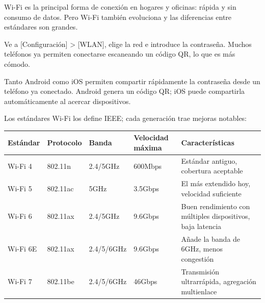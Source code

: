 Wi-Fi es la principal forma de conexión en hogares y oficinas: rápida y sin consumo de datos. Pero Wi-Fi también evoluciona y las diferencias entre estándares son grandes.


Ve a [Configuración] > [WLAN], elige la red e introduce la contraseña. Muchos teléfonos ya permiten conectarse escaneando un código QR, lo que es más cómodo.


Tanto Android como iOS permiten compartir rápidamente la contraseña desde un teléfono ya conectado. Android genera un código QR; iOS puede compartirla automáticamente al acercar dispositivos.


Los estándares Wi-Fi los define IEEE; cada generación trae mejoras notables:

\begin{center}
\begin{tabularx}{\linewidth}{|X|X|X|X|X|}
\hline
\textbf{Estándar} & \textbf{Protocolo} & \textbf{Banda} & \textbf{Velocidad máxima} & \textbf{Características} \tabularnewline
\hline
Wi-Fi 4 & 802.11n & 2.4/5GHz & 600Mbps & Estándar antiguo, cobertura aceptable \tabularnewline
Wi-Fi 5 & 802.11ac & 5GHz & 3.5Gbps & El más extendido hoy, velocidad suficiente \tabularnewline
Wi-Fi 6 & 802.11ax & 2.4/5GHz & 9.6Gbps & Buen rendimiento con múltiples dispositivos, baja latencia \tabularnewline
Wi-Fi 6E & 802.11ax & 2.4/5/6GHz & 9.6Gbps & Añade la banda de 6GHz, menos congestión \tabularnewline
Wi-Fi 7 & 802.11be & 2.4/5/6GHz & 46Gbps & Transmisión ultrarrápida, agregación multienlace \tabularnewline
\hline
\end{tabularx}
\end{center}

